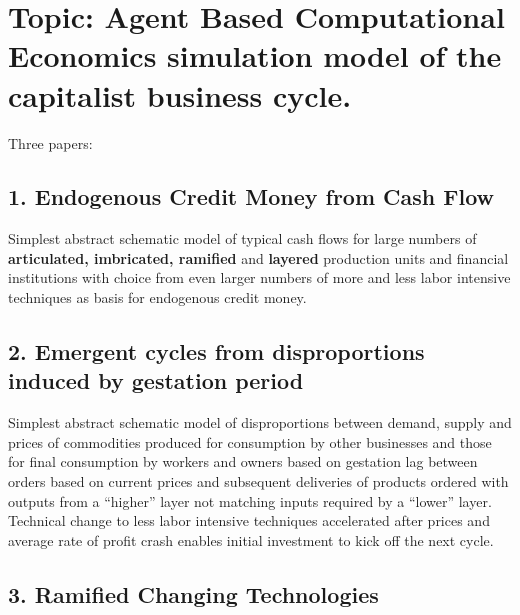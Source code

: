 \documentclass{article}
\begin{document}
\hypertarget{topic-agent-based-computational-economics-simulation-model-of-the-capitalist-business-cycle.}{%
\section{Topic: Agent Based Computational Economics simulation model of
the capitalist business
cycle.}\label{topic-agent-based-computational-economics-simulation-model-of-the-capitalist-business-cycle.}}

Three papers:

\hypertarget{endogenous-credit-money-from-cash-flow}{%
\subsection{1. Endogenous Credit Money from Cash
Flow}\label{endogenous-credit-money-from-cash-flow}}

Simplest abstract schematic model of typical cash flows for large
numbers of \textbf{articulated, imbricated, ramified} and
\textbf{layered} production units and financial institutions with choice
from even larger numbers of more and less labor intensive techniques as
basis for endogenous credit money.

\hypertarget{emergent-cycles-from-disproportions-induced-by-gestation-period}{%
\subsection{2. Emergent cycles from disproportions induced by gestation
period}\label{emergent-cycles-from-disproportions-induced-by-gestation-period}}

Simplest abstract schematic model of disproportions between demand,
supply and prices of commodities produced for consumption by other
businesses and those for final consumption by workers and owners based
on gestation lag between orders based on current prices and subsequent
deliveries of products ordered with outputs from a ``higher'' layer not
matching inputs required by a ``lower'' layer. Technical change to less
labor intensive techniques accelerated after prices and average rate of
profit crash enables initial investment to kick off the next cycle.

\hypertarget{ramified-changing-technologies}{%
\subsection{3. Ramified Changing
Technologies}\label{ramified-changing-technologies}}
\end{document}
